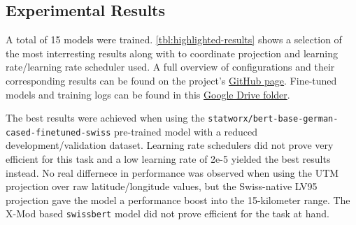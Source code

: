 \subsection{Experimental Results}
\label{sec:experimentalResults}

A total of 15 models were trained. \autoref{tbl:highlighted-results} shows a selection of the most interresting results along with to coordinate projection and learning rate/learning rate scheduler used. A full overview of configurations and their corresponding results can be found on the project's \href{https://github.com/oskarhlm/TDT13}{GitHub page}. Fine-tuned models and training logs can be found in this \href{https://drive.google.com/drive/folders/1-6nAdhvf5DBHtWzpZa6iH7z0dFETi80h?usp=sharing}{Google Drive folder}.

The best results were achieved when using the \texttt{statworx/bert-base-german-cased-finetuned-swiss} pre-trained model with a reduced development/validation dataset. Learning rate schedulers did not prove very efficient for this task and a low learning rate of 2e-5 yielded the best results instead. No real differnece in performance was observed when using the UTM projection over raw latitude/longitude values, but the Swiss-native LV95 projection gave the model a performance boost into the 15-kilometer range. The X-Mod based \texttt{swissbert} model did not prove efficient for the task at hand.

